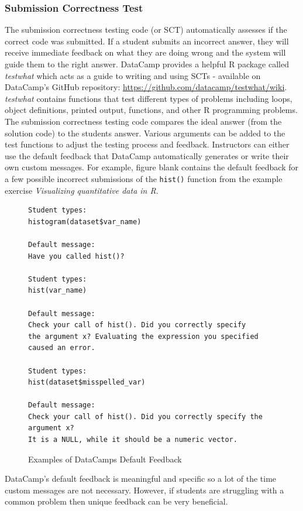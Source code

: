 \documentclass[12pt]{article}\usepackage[]{graphicx}\usepackage[]{color}
\begin{document}
\subsubsection{Submission Correctness Test}
The submission correctness testing code (or SCT) automatically assesses if the correct code was submitted. If a student submits an 
incorrect answer, they will receive immediate feedback on what they are doing wrong and the system will guide them to the right answer.
DataCamp provides a helpful R package called \textit{testwhat} which acts as a guide to writing and using SCTs - available on DataCamp's GitHub 
repository: \url{https://github.com/datacamp/testwhat/wiki}. 
\textit{testwhat} contains functions that test different types of problems including loops, object definitions, printed output, functions, and other R programming problems.
The submission correctness testing code compares the ideal answer (from the solution code) to the students answer. Various
arguments can be added to the test functions to adjust the testing process and feedback.
Instructors can either use the default feedback that DataCamp automatically generates or write their own custom messages. For example, figure blank
contains the default feedback for a few possible incorrect submissions of the \texttt{hist()} function from the example exercise \textit{Visualizing quantitative data in R}.

\begin{figure}
\caption{Examples of DataCamps Default Feedback}
\begin{Verbatim}
Student types:
histogram(dataset$var_name)

Default message:
Have you called hist()?

Student types:
hist(var_name)

Default message:
Check your call of hist(). Did you correctly specify 
the argument x? Evaluating the expression you specified
caused an error.

Student types:
hist(dataset$misspelled_var)

Default message:
Check your call of hist(). Did you correctly specify the
argument x? 
It is a NULL, while it should be a numeric vector.

\end{Verbatim}
\end{figure}
DataCamp's default feedback is meaningful and specific so a lot of the time custom 
messages are not necessary.
However, if students are struggling with a common problem then unique feedback can be very beneficial.
\end{document}
